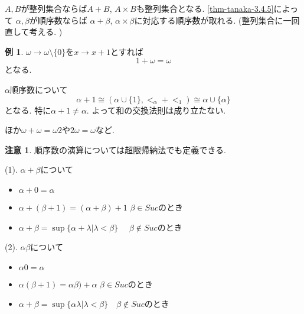 \documentclass[dvipdfmx,a4paper,11pt]{article}
\theoremstyle{definition}
\newtheorem{rem}[thm]{注意}
\newtheorem{exa}[thm]{例}
\begin{document}
$A,B$が整列集合ならば$A +B$, $A \times B$も整列集合となる. 
\ref{thm-tanaka-3.4.5}によって
$\alpha, \beta$が順序数ならば
$\alpha + \beta$, $\alpha \times \beta$に対応する順序数が取れる. 
(整列集合に一回直して考える. )

\begin{exa}
$\omega \to \omega \setminus \{ 0\}$を$x \to x+1$とすれば
$$
1 + \omega =\omega
$$
となる.

$\alpha$順序数について
$$
\alpha + 1
\cong 
(\alpha \cup \{ 1\}, <_{\alpha} + <_1)
\cong
\alpha \cup\{ \alpha\}
$$
となる. 
特に$\alpha + 1 \neq \alpha$.
よって和の交換法則は成り立たない. 

ほか$\omega + \omega = \omega 2$や$2 \omega = \omega$など. 
\end{exa}


\begin{rem}
順序数の演算については超限帰納法でも定義できる. 

(1). $\alpha + \beta$について
\begin{itemize}
\item $\alpha + 0 = \alpha$
\item $\alpha + (\beta+1) = (\alpha + \beta)+1$ $\beta \in Suc$のとき
\item $\alpha + \beta = \sup\{ \alpha +\lambda | \lambda<\beta\}$
　$\beta \not \in Suc$のとき
\end{itemize}

(2). $\alpha \beta$について
\begin{itemize}
\item $\alpha  0 = \alpha$
\item $\alpha (\beta+1) = \alpha \beta)+\alpha$ $\beta \in Suc$のとき
\item $\alpha + \beta = \sup\{ \alpha \lambda | \lambda<\beta\}$　$\beta \not \in Suc$のとき
\end{itemize}
\end{rem}
\end{document}

